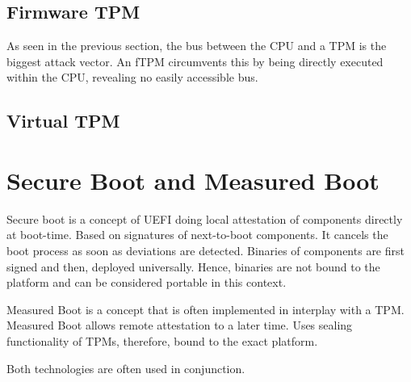 \subsection{Firmware TPM}

As seen in the previous section, the bus between the CPU and a TPM is the biggest attack vector. An fTPM circumvents this by being directly executed within the CPU, revealing no easily accessible bus.

\subsection{Virtual TPM}



\section{Secure Boot and Measured Boot}

Secure boot is a concept of UEFI doing local attestation of components directly at boot-time. Based on signatures of next-to-boot components. It cancels the boot process as soon as deviations are detected. Binaries of components are first signed and then, deployed universally. Hence, binaries are not bound to the platform and can be considered portable in this context.

Measured Boot is a concept that is often implemented in interplay with a TPM. Measured Boot allows remote attestation to a later time. Uses sealing functionality of TPMs, therefore, bound to the exact platform.

Both technologies are often used in conjunction.
